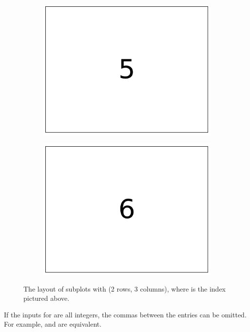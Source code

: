\begin{figure}[H]
\begin{subfigure}{.15\textwidth}
    \includegraphics[width=\linewidth]{figures/layout_5.pdf}
\end{subfigure}
%
\begin{subfigure}{.15\textwidth}
    \centering
    \includegraphics[width=\linewidth]{figures/layout_6.pdf}
\end{subfigure}
\caption{The layout of subplots with  (2 rows, 3 columns), where  is the index pictured above.}
\label{fig:subplots-layout}
\end{figure}

If the inputs for  are all integers, the commas between the entries can be omitted.
For example,  and  are equivalent.

